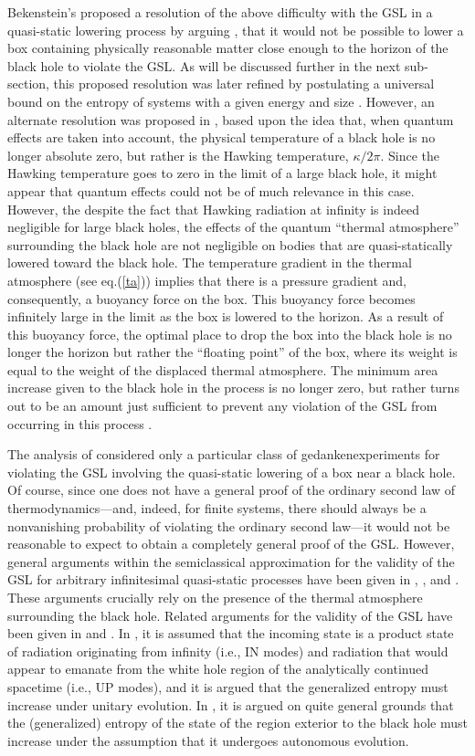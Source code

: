 \documentclass[12pt]{article}
\begin{document}
Bekenstein's proposed a resolution of the above difficulty with the
GSL in a quasi-static lowering process by arguing \cite{b1}, \cite{b2}
that it would not be possible to lower a box containing physically
reasonable matter close enough to the horizon of the black hole to
violate the GSL. As will be discussed further in the next sub-section,
this proposed resolution was later refined by postulating a universal
bound on the entropy of systems with a given energy and size
\cite{b3}. However, an alternate resolution was proposed in \cite{uw},
based upon the idea that, when quantum effects are taken into account,
the physical temperature of a black hole is no longer absolute zero,
but rather is the Hawking temperature, $\kappa/2\pi$. Since the
Hawking temperature goes to zero in the limit of a large black hole,
it might appear that quantum effects could not be of much relevance in
this case. However, the despite the fact that Hawking radiation at
infinity is indeed negligible for large black holes, the effects of
the quantum ``thermal atmosphere'' surrounding the black hole are not
negligible on bodies that are quasi-statically lowered toward the
black hole.  The temperature gradient in the thermal atmosphere (see
eq.(\ref{ta})) implies that there is a pressure gradient and,
consequently, a buoyancy force on the box. This buoyancy force becomes
infinitely large in the limit as the box is lowered to the horizon.
As a result of this buoyancy force, the optimal place to drop the box
into the black hole is no longer the horizon but rather the ``floating
point'' of the box, where its weight is equal to the weight of the
displaced thermal atmosphere. The minimum area increase given to the
black hole in the process is no longer zero, but rather turns out
to be an amount just sufficient to prevent any violation of the GSL
from occurring in this process \cite{uw}.

The analysis of \cite{uw} considered only a particular class of
gedankenexperiments for violating the GSL involving the quasi-static
lowering of a box near a black hole. Of course, since one does not
have a general proof of the ordinary second law of
thermodynamics---and, indeed, for finite systems, there should always
be a nonvanishing probability of violating the ordinary second
law---it would not be reasonable to expect to obtain a completely
general proof of the GSL. However, general arguments within the
semiclassical approximation for the validity of the GSL for arbitrary
infinitesimal quasi-static processes have been given in \cite{tz},
\cite{tzp}, and \cite{w4}. These arguments crucially rely on the
presence of the thermal atmosphere surrounding the black hole.
Related arguments for the validity of the GSL have been given in
\cite{fp} and \cite{s}. In \cite{fp}, it is assumed that the incoming
state is a product state of radiation originating from infinity (i.e.,
IN modes) and radiation that would appear to emanate from the white
hole region of the analytically continued spacetime (i.e., UP modes),
and it is argued that the generalized entropy must increase under
unitary evolution. In \cite{s}, it is argued on quite general grounds
that the (generalized) entropy of the state of the region exterior to
the black hole must increase under the assumption that it undergoes
autonomous evolution.
\end{document}
